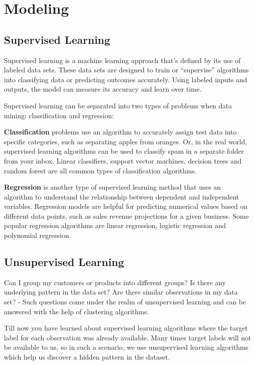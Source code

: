 	\chapter{Modeling}
	\section{Supervised Learning}
Supervised learning is a machine learning approach that's defined by its use of labeled data sets. These data sets are designed to train or ``supervise'' algorithms into classifying data or predicting outcomes accurately. Using labeled inputs and outputs, the model can measure its accuracy and learn over time.

Supervised learning can be separated into two types of problems when data mining: classification and regression:
	\begin{bulletedlist}
		\item \textbf{Classification} problems use an algorithm to accurately assign test data into specific categories, such as separating apples from oranges. Or, in the real world, supervised learning algorithms can be used to classify spam in a separate folder from your inbox. Linear classifiers, support vector machines, decision trees and random forest are all common types of classification algorithms.
		\item \textbf{Regression} is another type of supervised learning method that uses an algorithm to understand the relationship between dependent and independent variables. Regression models are helpful for predicting numerical values based on different data points, such as sales revenue projections for a given business. Some popular regression algorithms are linear regression, logistic regression and polynomial regression.
	\end{bulletedlist}

	\section{Unsupervised Learning}
Can I group my customers or products into different groups? Is there any underlying pattern in the data set? Are there similar observations in my data set? - Such questions come under the realm of unsupervised learning and can be answered with the help of clustering algorithms.

Till now you have learned about supervised learning algorithms where the target label for each observation was already available. Many times target labels will not be available to us, so in such a scenario, we use unsupervised learning algorithms which help us discover a hidden pattern in the dataset.


